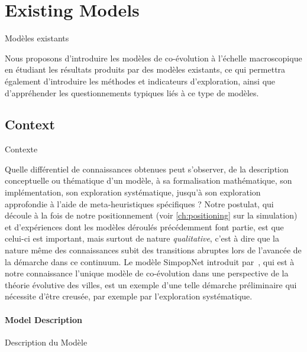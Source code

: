 




\newpage


\section[Existing Models][Modèles existants]{Existing Models}{Modèles existants}

\label{sec:macrocoevolexplo}



Nous proposons d'introduire les modèles de co-évolution à l'échelle macroscopique en étudiant les résultats produits par des modèles existants, ce qui permettra également d'introduire les méthodes et indicateurs d'exploration, ainsi que d'appréhender les questionnements typiques liés à ce type de modèles.



\subsection{Context}{Contexte}

Quelle différentiel de connaissances obtenues peut s'observer, de la description conceptuelle ou thématique d'un modèle, à sa formalisation mathématique, son implémentation, son exploration systématique, jusqu'à son exploration approfondie à l'aide de meta-heuristiques spécifiques ? Notre postulat, qui découle à la fois de notre positionnement (voir \autoref{ch:positioning} sur la simulation) et d'expériences dont les modèles déroulés précédemment font partie, est que celui-ci est important, mais surtout de nature \emph{qualitative}, c'est à dire que la nature même des connaissances subit des transitions abruptes lors de l'avancée de la démarche dans ce continuum. Le modèle SimpopNet introduit par~\cite{schmitt2014modelisation}, qui est à notre connaissance l'unique modèle de co-évolution dans une perspective de la théorie évolutive des villes, est un exemple d'une telle démarche préliminaire qui nécessite d'être creusée, par exemple par l'exploration systématique.


\paragraph{Model Description}{Description du Modèle}

